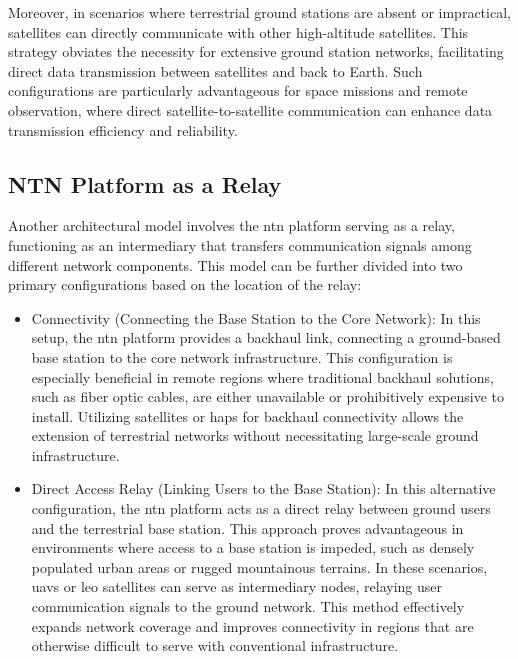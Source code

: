 Moreover, in scenarios where terrestrial ground stations are absent or impractical, satellites can directly communicate with other high-altitude satellites. This strategy obviates the necessity for extensive ground station networks, facilitating direct data transmission between satellites and back to Earth. Such configurations are particularly advantageous for space missions and remote observation, where direct satellite-to-satellite communication can enhance data transmission efficiency and reliability.

\subsection{NTN Platform as a Relay}\label{subsec:ntn_platform_as_a_relay}

Another architectural model involves the \gls{ntn} platform serving as a relay, functioning as an intermediary that transfers communication signals among different network components. This model can be further divided into two primary configurations based on the location of the relay:

\begin{itemize}
  \item \Backhaul Connectivity (Connecting the Base Station to the Core Network): In this setup, the \gls{ntn} platform provides a backhaul link, connecting a ground-based base station to the core network infrastructure. This configuration is especially beneficial in remote regions where traditional backhaul solutions, such as fiber optic cables, are either unavailable or prohibitively expensive to install. Utilizing satellites or \glspl{hap} for backhaul connectivity allows the extension of terrestrial networks without necessitating large-scale ground infrastructure.

  \item Direct Access Relay (Linking Users to the Base Station): In this alternative configuration, the \gls{ntn} platform acts as a direct relay between ground users and the terrestrial base station. This approach proves advantageous in environments where access to a base station is impeded, such as densely populated urban areas or rugged mountainous terrains. In these scenarios, \glspl{uav} or \gls{leo} satellites can serve as intermediary nodes, relaying user communication signals to the ground network. This method effectively expands network coverage and improves connectivity in regions that are otherwise difficult to serve with conventional infrastructure.
\end{itemize}

